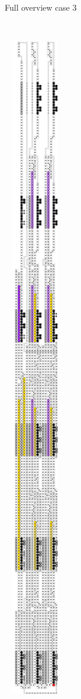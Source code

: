 \begin{figure}[H]
\begin{subfigure}[t]{0.3\textwidth}
        \caption{\label{fig:full_overview_case3_colored} Full overview case 3}
    \end{subfigure}%
    ~
    \begin{subfigure}[t]{0.3\textwidth}
        \centering
        \includegraphics[width=0.3\textwidth]{full_overview_case_2_colored}

\end{subfigure}
\end{figure}

